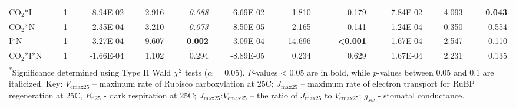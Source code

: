 \begin{landscape}
\begin{table}[]
{\begin{tabular}{p{3cm}p{0.5cm}p{1.75cm}p{1.5cm}p{1.5cm}p{1.75cm}p{1.5cm}p{1.5cm}p{1.75cm}p{1.5cm}p{1.5cm}}
            CO$_2$*I & \multicolumn{1}{r}{1}
            & \multicolumn{1}{r}{ 8.94E-02}     & \multicolumn{1}{r}{2.916}         & \multicolumn{1}{r}{\textit{0.088}}
            & \multicolumn{1}{r}{ 6.69E-02}     & \multicolumn{1}{r}{1.810}         & \multicolumn{1}{r}{0.179}
            & \multicolumn{1}{r}{-7.84E-02}     & \multicolumn{1}{r}{4.093}         & \multicolumn{1}{r}{\textbf{0.043}} 
            \\

            CO$_2$*N & \multicolumn{1}{r}{1}
            & \multicolumn{1}{r}{ 2.35E-04}     & \multicolumn{1}{r}{3.210}         & \multicolumn{1}{r}{\textit{0.073}}
            & \multicolumn{1}{r}{-8.50E-05}     & \multicolumn{1}{r}{2.165}         & \multicolumn{1}{r}{0.141}
            & \multicolumn{1}{r}{-1.24E-04}     & \multicolumn{1}{r}{0.350}         & \multicolumn{1}{r}{0.554} 
            \\

            I*N & \multicolumn{1}{r}{1}
            & \multicolumn{1}{r}{ 3.27E-04}     & \multicolumn{1}{r}{9.607}         & \multicolumn{1}{r}{\textbf{0.002}}
            & \multicolumn{1}{r}{-3.09E-04}     & \multicolumn{1}{r}{14.696}        & \multicolumn{1}{r}{\textbf{<0.001}}
            & \multicolumn{1}{r}{-1.67E-04}     & \multicolumn{1}{r}{2.547}         & \multicolumn{1}{r}{0.110} 
            \\

            CO$_2$*I*N & \multicolumn{1}{r}{1}
            & \multicolumn{1}{r}{-1.66E-04}     & \multicolumn{1}{r}{1.102}         & \multicolumn{1}{r}{0.294}
            & \multicolumn{1}{r}{-8.89E-05}     & \multicolumn{1}{r}{0.234}         & \multicolumn{1}{r}{0.629}
            & \multicolumn{1}{r}{ 1.67E-04}     & \multicolumn{1}{r}{2.231}         & \multicolumn{1}{r}{0.135} 
            \\
            \hline
            \multicolumn{11}{p{22.5cm}}{\textsuperscript{$*$}Significance determined using Type II Wald $\chi^{2}$ tests ($\alpha$ = 0.05). \textit{P}-values < 0.05 are in bold, while \textit{p}-values between 0.05 and 0.1 are italicized. Key: $V_\mathrm{cmax25}$ – maximum rate of Rubisco carboxylation at 25\textdegree{}C; $J_\mathrm{max25}$ – maximum rate of electron transport for RuBP regeneration at 25\textdegree{}C, $R_\mathrm{d25}$ - dark respiration at 25\textdegree{}C; $J_{\mathrm{max25}}$:$V_\mathrm{cmax25}$ – the ratio of $J_\mathrm{max25}$ to $V_\mathrm{cmax25}$; $g_{sw}$ - stomatal conductance.}
    \end{tabular}}
    \label{tab:table5.2}
    \end{table}
\end{landscape}
\clearpage


